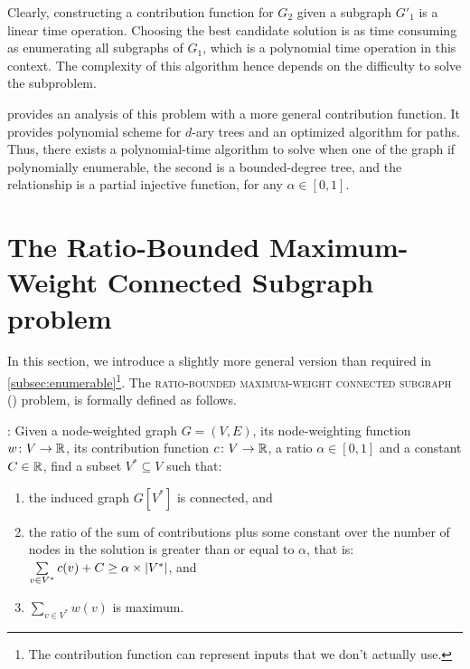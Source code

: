 			Clearly, constructing a contribution function for $G_2$ given a subgraph $G'_1$ is a linear time operation.
			Choosing the best candidate solution is as time consuming as enumerating all subgraphs of $G_1$, which is a polynomial time operation in this context.
			The complexity of this algorithm hence depends on the difficulty to solve the \rbmwcs{} subproblem.

			 provides an analysis of this problem with a more general contribution function.
			It provides polynomial scheme for $d$-ary trees and an optimized algorithm for paths.
			Thus, there exists a polynomial-time algorithm to solve \mwccs{} when one of the graph if polynomially enumerable, the second is a bounded-degree tree, and the relationship is a partial injective function, for any $\alpha \in [0, 1]$.

	\section{The Ratio-Bounded Maximum-Weight Connected Subgraph problem}
	\label{sec:rbmwcs}

		In this section, we introduce a slightly more general version than required in \cref{subsec:enumerable}\footnote{The contribution function can represent inputs that we don't actually use.}.
		The \textsc{ratio-bounded maximum-weight connected subgraph} (\rbmwcs) problem, is formally defined as follows.

		\textbf{\rbmwcs{}}: Given a node-weighted graph $G = (V, E)$, its node-weighting function $w\colon V \to \mathbb{R}$, its contribution function $c\colon V \to \mathbb{R}$, a ratio $\alpha \in [0,1]$ and a constant $C \in \mathbb{R}$, find a subset $V^* \subseteq V$ such that:
			\begin{enumerate}
				\item the induced graph $G\left[V^*\right]$ is connected, and
				\item the ratio of the sum of contributions plus some constant over the number of nodes in the solution is greater than or equal to $\alpha$, that is:\\
					$\sum\limits_{v \in V^*}{c(v)} + C \geq \alpha\times\lvert V^*\rvert$, and
				\item $\sum\limits_{v \in V^*}{w(v)}$ is maximum.
			\end{enumerate}

